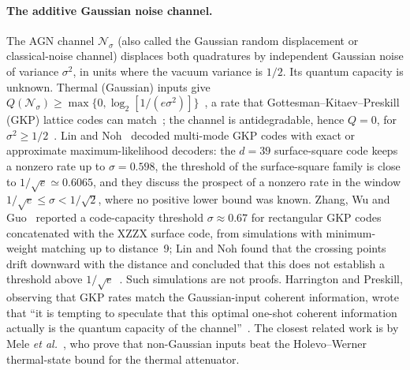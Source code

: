 \documentclass[aps,pra,reprint,superscriptaddress,nofootinbib,longbibliography,floatfix]{revtex4-2}
\theoremstyle{remark}
\newcommand{\Nsig}{\mathcal{N}_\sigma}
\begin{document}
\paragraph*{The additive Gaussian noise channel.}
The AGN channel $\Nsig$ (also called the Gaussian random displacement or classical-noise channel)
displaces both quadratures by independent Gaussian noise of variance $\sigma^2$, in units where the
vacuum variance is $1/2$. Its quantum capacity is unknown. Thermal (Gaussian) inputs give
$Q(\Nsig)\ge\max\{0,\log_2[1/(e\sigma^2)]\}$~\cite{holevo2001evaluating}, a rate that
Gottesman--Kitaev--Preskill (GKP) lattice codes can match~\cite{harrington2001achievable}; the channel
is antidegradable, hence $Q=0$, for
$\sigma^2\ge1/2$~\cite{caruso2006degradability,lami2019extendibility}. Lin and
Noh~\cite{lin2025gkp} decoded multi-mode GKP codes with exact or approximate maximum-likelihood
decoders: the $d=39$ surface-square code keeps a nonzero rate up to $\sigma=0.598$, the threshold of
the surface-square family is close to $1/\sqrt e\simeq0.6065$, and they discuss the prospect of a nonzero rate in the window
$1/\sqrt e\le\sigma<1/\sqrt2$, where no positive lower bound was known. Zhang, Wu and Guo~\cite{zhang2023xzzx}
reported a code-capacity threshold $\sigma\approx0.67$ for rectangular GKP codes concatenated with the
XZZX surface code, from simulations with minimum-weight matching up to distance~9; Lin and Noh found
that the crossing points drift downward with the distance and concluded that this does not establish a
threshold above $1/\sqrt e$~\cite{lin2025gkp}. Such simulations are not proofs. Harrington and
Preskill, observing that GKP rates match the Gaussian-input coherent information, wrote that ``it is
tempting to speculate that this optimal one-shot coherent information actually is the quantum capacity
of the channel''~\cite{harrington2001achievable}. The closest related work is
by Mele \textit{et al.}~\cite{mele2026thermal}, who prove that non-Gaussian inputs beat the
Holevo--Werner thermal-state bound for the thermal attenuator.
\end{document}
